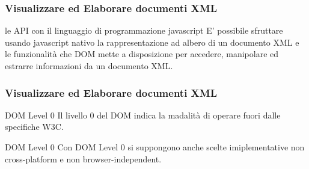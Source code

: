 \begin{frame}
    \frametitle{Visualizzare ed Elaborare documenti XML}
    \addtocounter{nframe}{1}
    

     \begin{block}{le API con il linguaggio di programmazione javascript}
       E' possibile sfruttare usando javascript nativo la rappresentazione ad albero di un documento XML e le funzionalità che DOM mette a disposizione per accedere, manipolare ed estrarre informazioni da un documento XML.
     \end{block}
     
\end{frame}


\begin{frame}
    \frametitle{Visualizzare ed Elaborare documenti XML}
    \addtocounter{nframe}{1}
    

     \begin{block}{DOM Level 0}
       Il livello 0 del DOM indica la madalità di operare fuori dalle specifiche W3C.
     \end{block}
     

     \begin{block}{DOM Level 0}
        Con DOM Level 0 si suppongono anche scelte imiplementative non cross-platform e non browser-independent.
      \end{block}

\end{frame}

